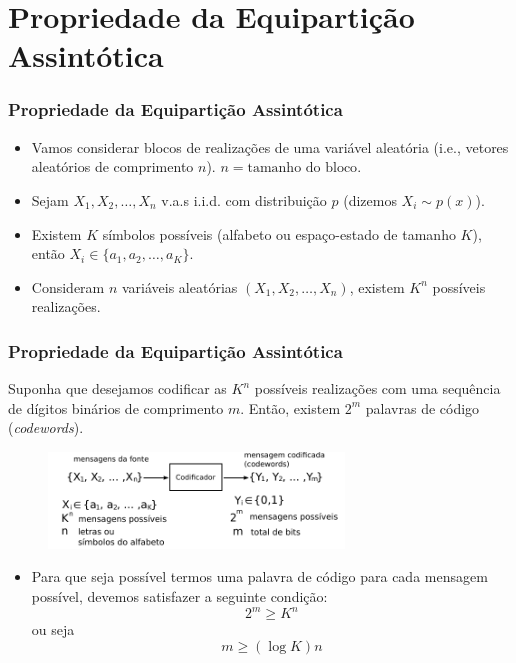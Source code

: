 \section{Propriedade da Equipartição Assintótica}

\begin{frame}%
  \frametitle{Propriedade da Equipartição Assintótica}
  \begin{itemize}
  \item Vamos considerar blocos de realizações de uma variável aleatória 
        (i.e., vetores aleatórios de comprimento $n$). $n = \text{tamanho do bloco}$.
  \item Sejam $X_1, X_2, \ldots, X_n$ v.a.s i.i.d. com distribuição $p$ (dizemos
        $X_i \sim p(x)$).
  \item Existem $K$ símbolos possíveis (alfabeto ou espaço-estado de tamanho $K$), então
        $X_i \in \{a_1, a_2, \ldots, a_K\}$.
  \item Consideram $n$ variáveis aleatórias $(X_1, X_2, \ldots, X_n)$, existem $K^n$ possíveis
        realizações.
  \end{itemize}
\end{frame}


\begin{frame}%
  \frametitle{Propriedade da Equipartição Assintótica}
  Suponha que desejamos codificar as $K^n$ possíveis realizações com uma sequência de
  dígitos binários de comprimento $m$. Então, existem $2^m$ palavras de código (\textit{codewords}).
  
  \begin{figure}[h!]
  \centering
  \includegraphics[width=0.7\textwidth]{images/blockcoding.pdf}
  \label{fig:blockcoding}
  \end{figure}
 
  \begin{itemize}
  \item Para que seja possível termos uma palavra de código para cada mensagem possível,
  devemos satisfazer a seguinte condição:
        \begin{equation}
        2^m \geq K^n
        \end{equation}
        ou seja
        \begin{equation}
        m \geq (\log K) n
        \end{equation}
  \end{itemize}
\end{frame}


